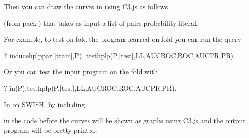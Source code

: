 \documentclass[letterpaper,10pt,english]{sphinxmanual}
\begin{document}
Then you can draw the curves in  using C3.js as follows

%
\begin{sphinxVerbatim}[commandchars=\\\{\}]
  
\end{sphinxVerbatim}

(from pack ) that takes as input a list  of pairs probability-literal.

For example, to test on fold  the program learned on fold  you can run the query

%
\begin{sphinxVerbatim}[commandchars=\\\{\}]
?\PYGZhy{} induce\PYGZus{}hplp\PYGZus{}par([train],P),
test\PYGZus{}hplp(P,[test],LL,AUCROC,ROC,AUCPR,PR).
\end{sphinxVerbatim}

Or you can test the input program on the fold  with

%
\begin{sphinxVerbatim}[commandchars=\\\{\}]
?\PYGZhy{} in(P),test\PYGZus{}hplp(P,[test],LL,AUCROC,ROC,AUCPR,PR).
\end{sphinxVerbatim}

In  on SWISH, by including

%
\begin{sphinxVerbatim}[commandchars=\\\{\}]
 
 
\end{sphinxVerbatim}

in the code before  the curves will be shown as graphs using C3.js and the output program will be pretty printed.
\end{document}
